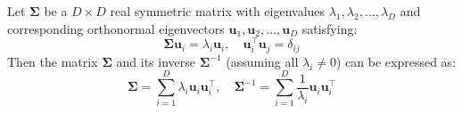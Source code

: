 \documentclass[../main.tex]{subfiles}
\begin{document}
\begin{yellow}
\begin{theorem}
Let $\boldsymbol{\Sigma}$ be a $D \times D$ real symmetric matrix with eigenvalues $\lambda_1, \lambda_2, \dots, \lambda_D$ and corresponding orthonormal eigenvectors $\mathbf{u}_1, \mathbf{u}_2, \dots, \mathbf{u}_D$ satisfying:
$$
\boldsymbol{\Sigma} \mathbf{u}_i = \lambda_i \mathbf{u}_i, \quad \mathbf{u}_i^\top \mathbf{u}_j = \delta_{ij}
$$
Then the matrix $\boldsymbol{\Sigma}$ and its inverse $\boldsymbol{\Sigma}^{-1}$ (assuming all $\lambda_i \neq 0$) can be expressed as:
$$
\boldsymbol{\Sigma} = \sum_{i=1}^{D} \lambda_i \mathbf{u}_i \mathbf{u}_i^\top, \quad \boldsymbol{\Sigma}^{-1} = \sum_{i=1}^{D} \frac{1}{\lambda_i} \mathbf{u}_i \mathbf{u}_i^\top
$$
\end{theorem}
\end{yellow}
\end{document}
